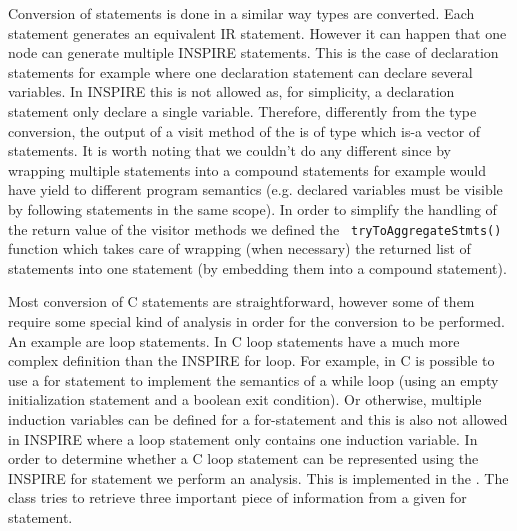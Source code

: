 Conversion of statements is done in a similar way types are converted. Each
statement generates an equivalent IR statement. However it can happen that one
 node can generate multiple INSPIRE statements. This is the
case of declaration statements for example where one declaration statement can
declare several variables. In INSPIRE this is not allowed as, for simplicity, a
declaration statement only declare a single variable. Therefore, differently
from the type conversion, the output of a visit method of the
 is of type  which is-a
vector of statements. It is worth noting that we couldn't do any different since
by wrapping multiple statements into a compound statements for example would
have yield to different program semantics (e.g. declared variables must be
visible by following statements in the same scope). In order to simplify the
handling of the return value of the visitor methods we defined the {\tt
tryToAggregateStmts()} function which takes care of wrapping (when necessary)
the returned list of statements into one statement (by embedding them into a
compound statement). 

Most conversion of C statements are straightforward, however some of them
require some special kind of analysis in order for the conversion to be
performed. An example are loop statements. In C loop statements have a much more
complex definition than the INSPIRE for loop. For example, in C is possible to
use a for statement to implement the semantics of a while loop (using an empty
initialization statement and a boolean exit condition). Or otherwise, multiple
induction variables can be defined for a for-statement and this is also not
allowed in INSPIRE where a loop statement only contains one induction variable.
In order to determine whether a C loop statement can be represented using the
INSPIRE for statement we perform an analysis. This is implemented in the
. The
 class tries to retrieve three important
piece of information from a given for statement. 

